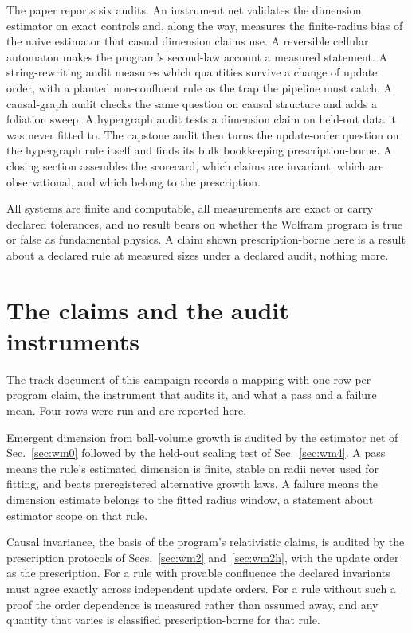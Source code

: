 \documentclass[aps,pre,reprint,nofootinbib]{revtex4-2}
\begin{document}
The paper reports six audits.  An instrument net validates the
dimension estimator on exact controls and, along the way, measures the
finite-radius bias of the naive estimator that casual dimension claims
use.  A reversible cellular automaton makes the program's second-law
account a measured statement.  A string-rewriting audit measures which
quantities survive a change of update order, with a planted
non-confluent rule as the trap the pipeline must catch.  A
causal-graph audit checks the same question on causal structure and
adds a foliation sweep.  A hypergraph audit tests a dimension claim on
held-out data it was never fitted to.  The capstone audit then turns
the update-order question on the hypergraph rule itself and finds its
bulk bookkeeping prescription-borne.  A closing section assembles the
scorecard, which claims are invariant, which are observational, and
which belong to the prescription.

All
systems are finite and computable, all measurements are exact or carry
declared tolerances, and no result bears on whether the Wolfram
program is true or false as fundamental physics.  A claim shown
prescription-borne here is a result about a declared rule at measured
sizes under a declared audit, nothing more.

\section{The claims and the audit instruments}
\label{sec:mapping}

The track document of this campaign records a mapping with one row per
program claim, the instrument that audits it, and what a pass and a
failure mean.  Four rows were run and are reported here.

Emergent dimension from ball-volume growth is audited by the
estimator net of Sec.~\ref{sec:wm0} followed by the held-out scaling
test of Sec.~\ref{sec:wm4}.  A pass means the rule's estimated
dimension is finite, stable on radii never used for fitting, and beats
preregistered alternative growth laws.  A failure means the dimension
estimate belongs to the fitted radius window, a statement about
estimator scope on that rule.

Causal invariance, the basis of the program's relativistic claims, is
audited by the prescription protocols of Secs.~\ref{sec:wm2}
and~\ref{sec:wm2h}, with the update order as the prescription.  For a
rule with provable confluence the declared invariants must agree
exactly across independent update orders.  For a rule without such a
proof the order dependence is measured rather than assumed away, and
any quantity that varies is classified prescription-borne for that
rule.
\end{document}
